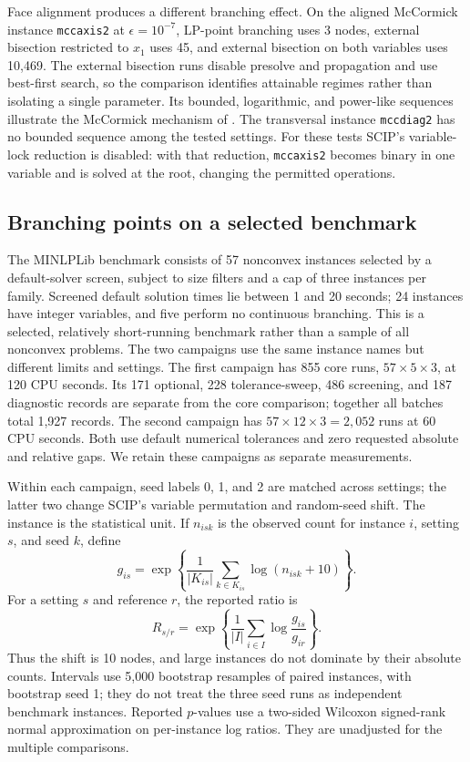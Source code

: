 Face alignment produces a different branching effect. On the aligned
McCormick instance \texttt{mccaxis2} at $\epsilon=10^{-7}$, LP-point
branching uses 3 nodes, external bisection restricted to $x_1$ uses 45,
and external bisection on both variables uses 10,469. The external
bisection runs disable presolve and propagation and use best-first search,
so the comparison identifies attainable regimes rather than isolating a
single parameter. Its bounded, logarithmic, and power-like sequences
illustrate the McCormick mechanism of . The transversal
instance \texttt{mccdiag2} has no bounded sequence among the tested
settings. For these tests SCIP's variable-lock reduction is disabled:
with that reduction, \texttt{mccaxis2} becomes binary in one variable and
is solved at the root, changing the permitted operations.

\subsection{Branching points on a selected benchmark}
\label{experiments:benchmark}

The MINLPLib benchmark consists of 57 nonconvex instances selected by a
default-solver screen, subject to size filters and a cap of three instances
per family. Screened default solution times lie between 1 and 20 seconds;
24 instances have integer variables, and five perform no continuous
branching. This is a selected, relatively short-running benchmark rather
than a sample of all nonconvex problems. The two campaigns use the same
instance names but different limits and settings. The first campaign has
855 core runs, $57\times5\times3$, at 120 CPU seconds. Its 171 optional,
228 tolerance-sweep, 486 screening, and 187 diagnostic records are separate
from the core comparison; together all batches total 1,927 records.
The second campaign has $57\times12\times3=2,052$ runs at 60 CPU seconds.
Both use default numerical tolerances and zero requested absolute and
relative gaps. We retain these campaigns as separate measurements.

Within each campaign, seed labels 0, 1, and 2 are matched across settings;
the latter two change SCIP's variable permutation and random-seed shift.
The instance is the statistical unit. If $n_{isk}$ is the observed count
for instance $i$, setting $s$, and seed $k$, define
\[
  g_{is}=\exp\left\{\frac{1}{|K_{is}|}
                  \sum_{k\in K_{is}}\log(n_{isk}+10)\right\}.
\]
For a setting $s$ and reference $r$, the reported ratio is
\begin{equation}
  R_{s/r}=\exp\left\{\frac{1}{|I|}
                \sum_{i\in I}\log\frac{g_{is}}{g_{ir}}\right\}.
  \label{experiments:eq-ratio}
\end{equation}
Thus the shift is 10 nodes, and large instances do not dominate by their
absolute counts. Intervals use 5,000 bootstrap resamples of paired
instances, with bootstrap seed 1; they do not treat the three seed runs as
independent benchmark instances. Reported $p$-values use a two-sided
Wilcoxon signed-rank normal approximation on per-instance log ratios.
They are unadjusted for the multiple comparisons.


